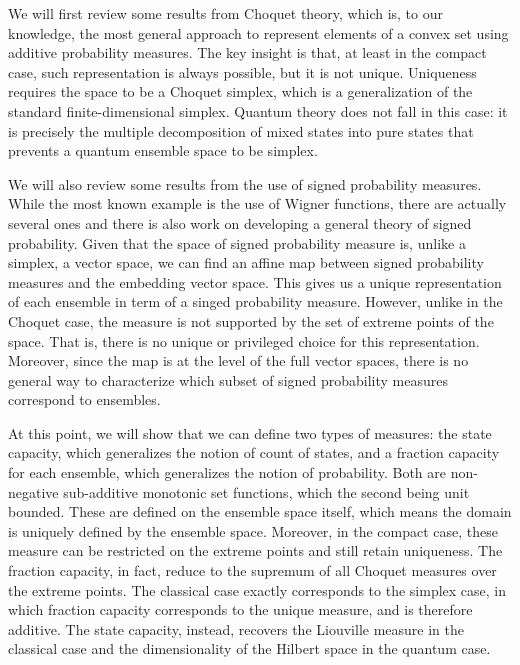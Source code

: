 \documentclass[10pt,twocolumn, nofootinbib]{revtex4-2}
\begin{document}
We will first review some results from Choquet theory, which is, to our knowledge, the most general approach to represent elements of a convex set using additive probability measures. The key insight is that, at least in the compact case, such representation is always possible, but it is not unique. Uniqueness requires the space to be a Choquet simplex, which is a generalization of the standard finite-dimensional simplex. Quantum theory does not fall in this case: it is precisely the multiple decomposition of mixed states into pure states that prevents a quantum ensemble space to be simplex.

We will also review some results from the use of signed probability measures. While the most known example is the use of Wigner functions, there are actually several ones and there is also work on developing a general theory of signed probability. Given that the space of signed probability measure is, unlike a simplex, a vector space, we can find an affine map between signed probability measures and the embedding vector space. This gives us a unique representation of each ensemble in term of a singed probability measure. However, unlike in the Choquet case, the measure is not supported by the set of extreme points of the space. That is, there is no unique or privileged choice for this representation. Moreover, since the map is at the level of the full vector spaces, there is no general way to characterize which subset of signed probability measures correspond to ensembles.

At this point, we will show that we can define two types of measures: the state capacity, which generalizes the notion of count of states, and a fraction capacity for each ensemble, which generalizes the notion of probability. Both are non-negative sub-additive monotonic set functions, which the second being unit bounded. These are defined on the ensemble space itself, which means the domain is uniquely defined by the ensemble space. Moreover, in the compact case, these measure can be restricted on the extreme points and still retain uniqueness. The fraction capacity, in fact, reduce to the supremum of all Choquet measures over the extreme points. The classical case exactly corresponds to the simplex case, in which fraction capacity corresponds to the unique measure, and is therefore additive. The state capacity, instead, recovers the Liouville measure in the classical case and the dimensionality of the Hilbert space in the quantum case.
\end{document}
